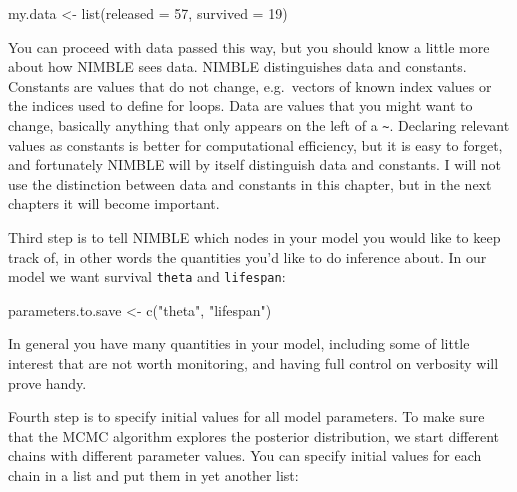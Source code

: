 \documentclass[
  12pt,
]{krantz}
\newenvironment{Shaded}{\begin{snugshade}}{\end{snugshade}}
\newcommand{\AttributeTok}[1]{\textcolor[rgb]{0.77,0.63,0.00}{#1}}
\newcommand{\DecValTok}[1]{\textcolor[rgb]{0.00,0.00,0.81}{#1}}
\newcommand{\FunctionTok}[1]{\textcolor[rgb]{0.00,0.00,0.00}{#1}}
\newcommand{\NormalTok}[1]{#1}
\newcommand{\OtherTok}[1]{\textcolor[rgb]{0.56,0.35,0.01}{#1}}
\newcommand{\StringTok}[1]{\textcolor[rgb]{0.31,0.60,0.02}{#1}}
\begin{document}
\begin{Shaded}
\begin{Highlighting}[]
\NormalTok{my.data }\OtherTok{\textless{}{-}} \FunctionTok{list}\NormalTok{(}\AttributeTok{released =} \DecValTok{57}\NormalTok{, }\AttributeTok{survived =} \DecValTok{19}\NormalTok{)}
\end{Highlighting}
\end{Shaded}

You can proceed with data passed this way, but you should know a little more about how NIMBLE sees data. NIMBLE distinguishes data and constants. Constants are values that do not change, e.g.~vectors of known index values or the indices used to define for loops. Data are values that you might want to change, basically anything that only appears on the left of a \texttt{\textasciitilde{}}. Declaring relevant values as constants is better for computational efficiency, but it is easy to forget, and fortunately NIMBLE will by itself distinguish data and constants. I will not use the distinction between data and constants in this chapter, but in the next chapters it will become important.

Third step is to tell NIMBLE which nodes in your model you would like to keep track of, in other words the quantities you'd like to do inference about. In our model we want survival \texttt{theta} and \texttt{lifespan}:

\begin{Shaded}
\begin{Highlighting}[]
\NormalTok{parameters.to.save }\OtherTok{\textless{}{-}} \FunctionTok{c}\NormalTok{(}\StringTok{"theta"}\NormalTok{, }\StringTok{"lifespan"}\NormalTok{)}
\end{Highlighting}
\end{Shaded}

In general you have many quantities in your model, including some of little interest that are not worth monitoring, and having full control on verbosity will prove handy.

Fourth step is to specify initial values for all model parameters. To make sure that the MCMC algorithm explores the posterior distribution, we start different chains with different parameter values. You can specify initial values for each chain in a list and put them in yet another list:
\end{document}
